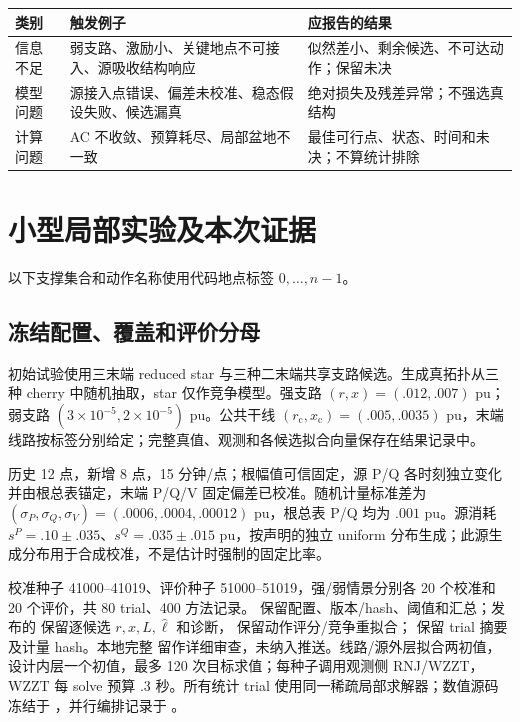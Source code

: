 \documentclass[UTF8,fontset=fandol,11pt,a4paper]{ctexart}
\begin{document}
\begin{center}\small
\begin{tabular}{L{.17\textwidth}L{.34\textwidth}L{.39\textwidth}}\toprule
类别 & 触发例子 & 应报告的结果\\\midrule
信息不足 & 弱支路、激励小、关键地点不可接入、源吸收结构响应 & 似然差小、剩余候选、不可达动作；保留未决\\
模型问题 & 源接入点错误、偏差未校准、稳态假设失败、候选漏真 & 绝对损失及残差异常；不强选真结构\\
计算问题 & AC 不收敛、预算耗尽、局部盆地不一致 & 最佳可行点、状态、时间和未决；不算统计排除\\\bottomrule
\end{tabular}
\end{center}

\section{小型局部实验及本次证据}
\label{sec:results}
以下支撑集合和动作名称使用代码地点标签 $0,\ldots,n-1$。
\subsection{冻结配置、覆盖和评价分母}
初始试验使用三末端 reduced star 与三种二末端共享支路候选。生成真拓扑从三种 cherry 中随机抽取，star 仅作竞争模型。强支路 $(r,x)=(.012,.007)$ pu；弱支路 $(3\times10^{-5},2\times10^{-5})$ pu。公共干线 $(r_{\mathrm c},x_{\mathrm c})=(.005,.0035)$ pu，末端线路按标签分别给定；完整真值、观测和各候选拟合向量保存在结果记录中。

历史 12 点，新增 8 点，15 分钟/点；根幅值可信固定，源 P/Q 各时刻独立变化并由根总表锚定，末端 P/Q/V 固定偏差已校准。随机计量标准差为 $(\sigma_P,\sigma_Q,\sigma_V)=(.0006,.0004,.00012)$ pu，根总表 P/Q 均为 $.001$ pu。源消耗 $s^P=.10\pm.035$、$s^Q=.035\pm.015$ pu，按声明的独立 uniform 分布生成；此源生成分布用于合成校准，不是估计时强制的固定比率。

校准种子 41000--41019、评价种子 51000--51019，强/弱情景分别各 20 个校准和 20 个评价，共 80 trial、400 方法记录。 保留配置、版本/hash、阈值和汇总；发布的  保留逐候选 $r,x,L,\widehat\ell$ 和诊断， 保留动作评分/竞争重拟合； 保留 trial 摘要及计量 hash。本地完整  留作详细审查，未纳入推送。线路/源外层拟合两初值，设计内层一个初值，最多 120 次目标求值；每种子调用观测侧 RNJ/WZZT，WZZT 每 solve 预算 .3 秒。所有统计 trial 使用同一稀疏局部求解器；数值源码冻结于 ，并行编排记录于 。
\end{document}
